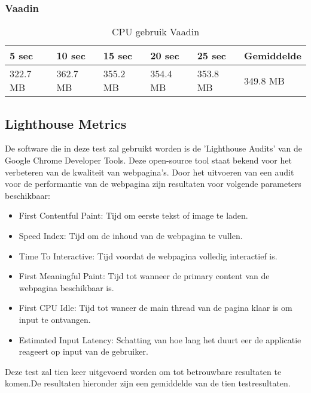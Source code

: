 \subsubsection{Vaadin}
\begin{table}[H]
	\begin{tabular}{|l|l|l|l|l|l|}
		\hline
		\textbf{5 sec} & \textbf{10 sec} & \textbf{15 sec} & \textbf{20 sec} & \textbf{25 sec} & \textbf{Gemiddelde} \\ \hline
		322.7 MB       & 362.7 MB        & 355.2 MB        & 354.4 MB        & 353.8 MB        & 349.8 MB            \\ \hline
	\end{tabular}
\caption{CPU gebruik Vaadin}
\label{table:vaadinCPU}
\end{table}

\subsection{Lighthouse Metrics}
De software die in deze test zal gebruikt worden is de 'Lighthouse Audits' van de Google Chrome Developer Tools. Deze open-source tool staat bekend voor het verbeteren van de kwaliteit van webpagina's. Door het uitvoeren van een audit voor de performantie van de webpagina zijn resultaten voor volgende parameters beschikbaar:
\begin{itemize}
	\item First Contentful Paint: Tijd om eerste tekst of image te laden.
	\item Speed Index: Tijd om de inhoud van de webpagina te vullen.
	\item Time To Interactive: Tijd voordat de webpagina volledig interactief is.
	\item First Meaningful Paint: Tijd tot wanneer de primary content van de webpagina beschikbaar is. 
	\item First CPU Idle: Tijd tot waneer de main thread van de pagina klaar is om input te ontvangen. 
	\item Estimated Input Latency: Schatting van hoe lang het duurt eer de applicatie reageert op input van de gebruiker.
\end{itemize}
Deze test zal tien keer uitgevoerd worden om tot betrouwbare resultaten te komen.De resultaten hieronder zijn een gemiddelde van de tien testresultaten.  

